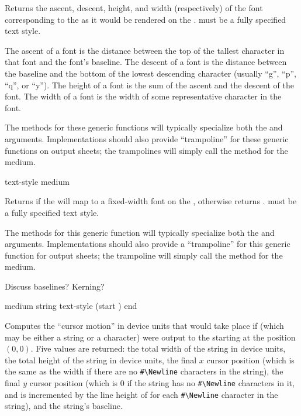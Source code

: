 Returns the ascent, descent, height, and width (respectively) of the font
corresponding to the   as it would be rendered
on the  .   must be a fully specified
text style.

The ascent of a font is the distance between the top of the tallest character in
that font and the font's baseline.  The descent of a font is the distance
between the baseline and the bottom of the lowest descending character (usually
``g'', ``p'', ``q'', or ``y'').  The height of a font is the sum of the ascent
and the descent of the font.  The width of a font is the width of some
representative character in the font.

The methods for these generic functions will typically specialize both the
 and  arguments.  Implementations should also
provide ``trampoline'' for these generic functions on output sheets; the
trampolines will simply call the method for the medium.


 {text-style medium}

Returns  if the   will map to a
fixed-width font on the  , otherwise returns
.   must be a fully specified text style.

The methods for this generic function will typically specialize both the
 and  arguments.  Implementations should also
provide a ``trampoline'' for this generic function for output sheets; the
trampoline will simply call the method for the medium.


 {Discuss baselines?  Kerning?}


 {medium string \key text-style (start ) end} 

Computes the ``cursor motion'' in device units that would take place if
 (which may be either a string or a character) were output to the
  starting at the position $(0,0)$.  Five values are
returned:  the total width of the string in device units, the total height of
the string in device units, the final $x$ cursor position (which is the same as
the width if there are no \verb+#\Newline+ characters in the string), the final
$y$ cursor position (which is 0 if the string has no \verb+#\Newline+ characters
in it, and is incremented by the line height of  for each
\verb+#\Newline+ character in the string), and the string's baseline.


